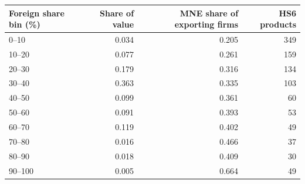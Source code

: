 \begin{tabular}{lrrr}
\toprule
Foreign share bin (\%) & Share of value & MNE share of exporting firms & HS6 products \\
\midrule
0--10 & 0.034 & 0.205 & 349 \\
10--20 & 0.077 & 0.261 & 159 \\
20--30 & 0.179 & 0.316 & 134 \\
30--40 & 0.363 & 0.335 & 103 \\
40--50 & 0.099 & 0.361 & 60 \\
50--60 & 0.091 & 0.393 & 53 \\
60--70 & 0.119 & 0.402 & 49 \\
70--80 & 0.016 & 0.466 & 37 \\
80--90 & 0.018 & 0.409 & 30 \\
90--100 & 0.005 & 0.664 & 49 \\
\bottomrule
\end{tabular}
